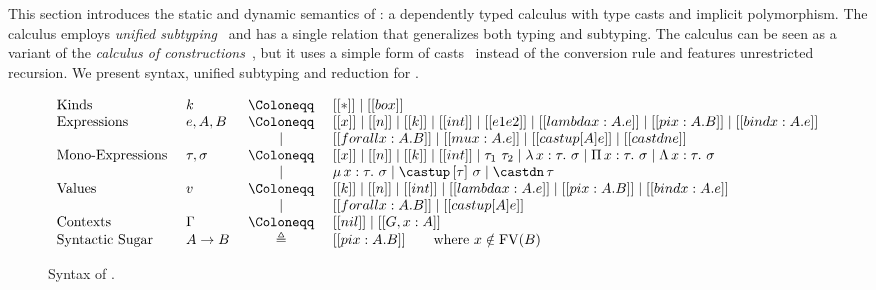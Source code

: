 \section{\System}

This section introduces the static and dynamic semantics of
\name: a dependently typed calculus with type casts
and implicit polymorphism. The calculus employs
\emph{unified subtyping}~\cite{CoquandThierry1988Tcoc}
and has a single relation that generalizes both typing and subtyping.
The calculus can be seen as a variant of the \emph{calculus of constructions}~\cite{},
but it uses a simple form of casts~\cite{} instead of the conversion rule
and features unrestricted recursion. We present syntax, unified subtyping
and reduction for \name.

\begin{figure}[t]
\centering
\begin{equation*}
\begin{array}{llcl}
    \text{Kinds} & k & ~\Coloneqq ~ & [[*]] \mid [[box]] \\
    \text{Expressions} & e, A, B & ~ \Coloneqq ~ & [[x]] \mid [[n]] \mid [[k]] \mid [[int]] \mid [[e1 e2]] \mid [[lambda x : A. e]]
        \mid [[pi x : A. B]] \mid [[bind x : A. e]] \\
        & & \mid & [[forall x : A. B]] \mid [[mu x : A. e]] \mid [[castup [A] e]] \mid [[castdn e]]   \\
    \text{Mono-Expressions} ~ & \tau, \sigma & ~ \Coloneqq ~ & [[x]] \mid [[n]] \mid [[k]] \mid [[int]] \mid \tau_1 ~ \tau_2 \mid \lambda \, x : \tau. ~ \sigma \mid \Pi \, x : \tau. ~ \sigma \mid \Lambda \, x : \tau. ~ \sigma \\
        & & \mid & \mu \, x : \tau. ~ \sigma \mid \castup \, [\tau]~ \sigma \mid \castdn \, \tau \\
    \text{Values} & v & ~ \Coloneqq ~ & [[k]] \mid [[n]] \mid [[int]] \mid [[lambda x : A. e]] \mid [[pi x : A. B]] \mid [[bind x : A. e]] \\
        & & \mid & [[forall x : A. B]] \mid [[castup [A] e]] \\
    \text{Contexts} & \Gamma & ~ \Coloneqq ~ & [[nil]] \mid [[G , x : A]] \\
    \text{Syntactic Sugar} ~ & A \rightarrow B & \triangleq & [[pi x : A. B]] \qquad \text{where} ~ x \notin \mathrm{FV}(B)
\end{array}
\end{equation*}
\caption{Syntax of \name.}
\label{fig:syntax}
\end{figure}

